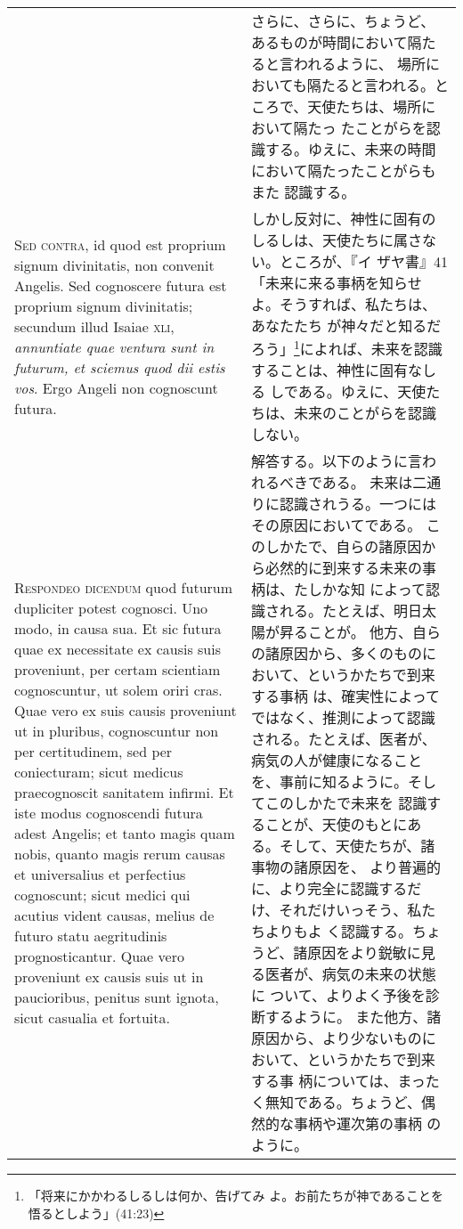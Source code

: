 \documentclass[10pt]{jsarticle} %
\begin{document}
\begin{longtable}{p{21em}p{21em}}
&

さらに、さらに、ちょうど、あるものが時間において隔たると言われるように、
 場所においても隔たると言われる。ところで、天使たちは、場所において隔たっ
 たことがらを認識する。ゆえに、未来の時間において隔たったことがらもまた
 認識する。
 
\\


{\scshape  Sed contra}, id quod est proprium signum
divinitatis, non convenit Angelis. Sed cognoscere futura est proprium
signum divinitatis; secundum illud Isaiae {\scshape xli}, {\itshape annuntiate quae ventura
sunt in futurum, et sciemus quod dii estis vos}. Ergo Angeli non
cognoscunt futura.


&

 しかし反対に、神性に固有のしるしは、天使たちに属さない。ところが、『イ
 ザヤ書』41「未来に来る事柄を知らせよ。そうすれば、私たちは、あなたたち
 が神々だと知るだろう」\footnote{「将来にかかわるしるしは何か、告げてみ
 よ。お前たちが神であることを悟るとしよう」(41:23)}によれば、未来を認識することは、神性に固有なしる
 しである。ゆえに、天使たちは、未来のことがらを認識しない。

 
\\


{\scshape Respondeo dicendum} quod futurum dupliciter
potest cognosci. Uno modo, in causa sua. Et sic futura quae ex
necessitate ex causis suis proveniunt, per certam scientiam
cognoscuntur, ut solem oriri cras. Quae vero ex suis causis proveniunt
ut in pluribus, cognoscuntur non per certitudinem, sed per coniecturam;
sicut medicus praecognoscit sanitatem infirmi. Et iste modus cognoscendi
futura adest Angelis; et tanto magis quam nobis, quanto magis rerum
causas et universalius et perfectius cognoscunt; sicut medici qui
acutius vident causas, melius de futuro statu aegritudinis
prognosticantur. Quae vero proveniunt ex causis suis ut in paucioribus,
 penitus sunt ignota, sicut casualia et fortuita.


 &

 解答する。以下のように言われるべきである。
 未来は二通りに認識されうる。一つにはその原因においてである。
 このしかたで、自らの諸原因から必然的に到来する未来の事柄は、たしかな知
 によって認識される。たとえば、明日太陽が昇ることが。
 他方、自らの諸原因から、多くのものにおいて、というかたちで到来する事柄
 は、確実性によってではなく、推測によって認識される。たとえば、医者が、
 病気の人が健康になることを、事前に知るように。そしてこのしかたで未来を
 認識することが、天使のもとにある。そして、天使たちが、諸事物の諸原因を、
 より普遍的に、より完全に認識するだけ、それだけいっそう、私たちよりもよ
 く認識する。ちょうど、諸原因をより鋭敏に見る医者が、病気の未来の状態に
 ついて、よりよく予後を診断するように。
 また他方、諸原因から、より少ないものにおいて、というかたちで到来する事
 柄については、まったく無知である。ちょうど、偶然的な事柄や運次第の事柄
 のように。


\end{longtable}
\end{document}

